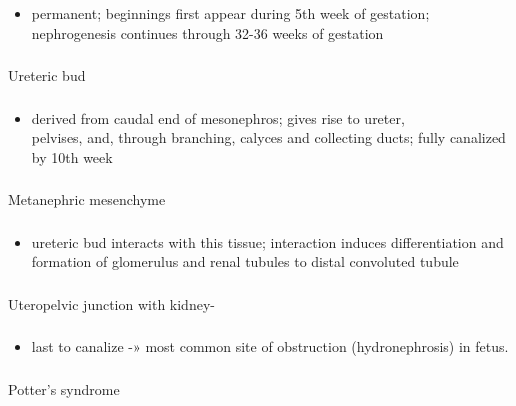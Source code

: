 \documentclass[11pt]{beamer}
\begin{document}
\begin{frame}
 \frametitle{}
\begin{itemize}
\item{permanent; beginnings first appear during 5th week of gestation; \\ nephrogenesis continues through 32-36 weeks of gestation}
\end{itemize}
\end{frame}

\begin{frame}
 \frametitle{}
 Ureteric bud 
\end{frame}

\begin{frame}
 \frametitle{}
\begin{itemize}
\item{derived from caudal end of mesonephros; gives rise to ureter, \\ pelvises, and, through branching, calyces and collecting ducts; fully canalized by 10th week}
\end{itemize}
\end{frame}

\begin{frame}
 \frametitle{}
Metanephric mesenchyme
\end{frame}

\begin{frame}
 \frametitle{}
\begin{itemize}
\item{ureteric bud interacts with this tissue; interaction induces differentiation and formation of glomerulus and renal tubules to distal convoluted tubule}
\end{itemize}
\end{frame}

\begin{frame}
 \frametitle{}
Uteropelvic junction with kidney-
\end{frame}

\begin{frame}
 \frametitle{}
\begin{itemize}
\item{last to canalize -» most common site of obstruction (hydronephrosis) in fetus.}
\end{itemize}
\end{frame}

\begin{frame}
 \frametitle{}
Potter's syndrome
\end{frame}
\end{document}
